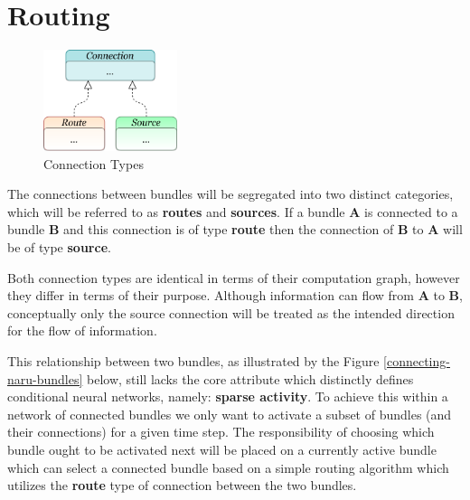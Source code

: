  \clearpage


\section{Routing}\label{sec_naru-routing}


\begin{figure}
    \centering 
    \includegraphics[width=0.35\textwidth]{PICs/NARU/naru-connection-types.png}
    \caption{Connection Types}
    \label{connection-types}
\end{figure}

 
The connections between bundles will be segregated into two distinct categories, which will be referred to as \textbf{routes} and \textbf{sources}.   
If a bundle \textbf{A} is connected to a bundle \textbf{B} and this connection is of type 
\textbf{route} then the connection of \textbf{B} to \textbf{A} will be of type \textbf{source}. 

Both connection types are identical in terms of their computation graph, however
they differ in terms of their purpose.
Although information can flow from \textbf{A}
to \textbf{B}, conceptually only the source connection will be treated as the intended direction for the flow of information.
 

This relationship between two bundles, as illustrated by the Figure \ref{connecting-naru-bundles} below, still lacks the core attribute which distinctly defines conditional neural networks, namely: \textbf{sparse activity}. \linebreak
To achieve this within a network of connected bundles we only want to activate a subset of bundles (and their connections) for a given time step. The responsibility of choosing which bundle ought to be activated next will be placed on a currently active bundle which can select a connected bundle based on a simple routing algorithm which utilizes the \textbf{route} type of connection between the two bundles.
 


